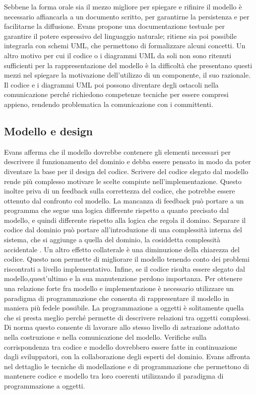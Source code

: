 \documentclass[a4paper,12pt]{report}
\begin{document}
Sebbene la forma orale sia il mezzo migliore per spiegare e rifinire il modello è necessario affiancarla a un documento scritto, per garantirne la persistenza e per facilitarne la diffusione.
Evans propone una documentazione testuale per garantire il potere espressivo del linguaggio naturale; ritiene sia poi possibile integrarla con schemi UML, che permettono di formalizzare alcuni concetti.
Un altro motivo per cui il codice o i diagrammi UML da soli non sono ritenuti sufficienti per la rappresentazione del modello è la difficoltà che presentano questi mezzi nel spiegare la motivazione dell'utilizzo di un componente, il suo razionale.  
Il codice e i diagrammi UML poi possono diventare degli ostacoli nella comunicazione perché richiedono competenze tecniche per essere compresi appieno, rendendo problematica la comunicazione con i committenti.

\subsection{Modello e design}

Evans afferma che il modello dovrebbe contenere gli elementi necessari per descrivere il funzionamento del dominio e debba essere pensato in modo da poter diventare la base per il design del codice.
Scrivere del codice slegato dal modello rende più complesso motivare le scelte compiute nell'implementazione. 
Questo inoltre priva di un feedback sulla correttezza del codice, che potrebbe essere ottenuto dal confronto col modello.
La mancanza di feedback può portare a un programma che segue una logica differente rispetto a quanto precisato dal modello, e quindi differente rispetto alla logica che regola il domino.
Separare il codice dal dominio può portare all'introduzione di una complessità interna del sistema, che si aggiunge a quella del dominio, la cosiddetta complessità accidentale \cite{brooks_no_1987}. 
Un altro effetto collaterale è una diminuzione della chiarezza del codice.
Questo non permette di migliorare il modello tenendo conto dei problemi riscontrati a livello implementativo. 
Infine, se il codice risulta essere slegato dal modello,quest'ultimo e la sua manutenzione perdono importanza. 
Per ottenere una relazione forte fra modello e implementazione è necessario utilizzare un paradigma di programmazione che consenta di rappresentare il modello in maniera più fedele possibile. 
La programmazione a oggetti è solitamente quella che si presta meglio perché permette di descrivere relazioni tra oggetti complessi. 
Di norma questo consente di lavorare allo stesso livello di astrazione adottato nella costruzione e nella comunicazione del modello.
Verifiche sulla corrispondenza tra codice e modello dovrebbero essere fatte in continuazione dagli sviluppatori, con la collaborazione degli esperti del dominio.
Evans affronta nel dettaglio le tecniche di modellazione e di programmazione che permettono di mantenere codice e modello tra loro coerenti utilizzando il paradigma di programmazione a oggetti.
\end{document}
